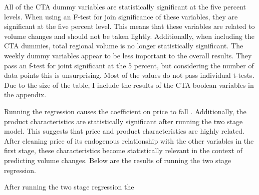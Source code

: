 \documentclass{article}
\begin{document}
All of the CTA dummy variables are statistically significant at the five percent levels. When using an F-test for join significance of these variables, they are significant at the five percent level. This means that these variables are related to volume changes and should not be taken lightly. Additionally, when including the CTA dummies, total regional volume is no longer statistically significant. The weekly dummy variables appear to be less important to the overall results. They pass an f-test for joint significant at the 5 percent, but considering the number of data points this is unsurprising. Most of the values do not pass individual t-tests. Due to the size of the table, I include the results of the CTA boolean variables in the appendix.


Running the regression causes the coefficient on price to fall . Additionally, the product characteristics are statistically significant after running the two stage model. This suggests that price and product characteristics are highly related. After cleaning price of its endogenous relationship with the other variables in the first stage, these characteristics become statistically relevant in the context of predicting volume changes. Below are the results of running the two stage regression.

After running the two stage regression  the 
\end{document}
